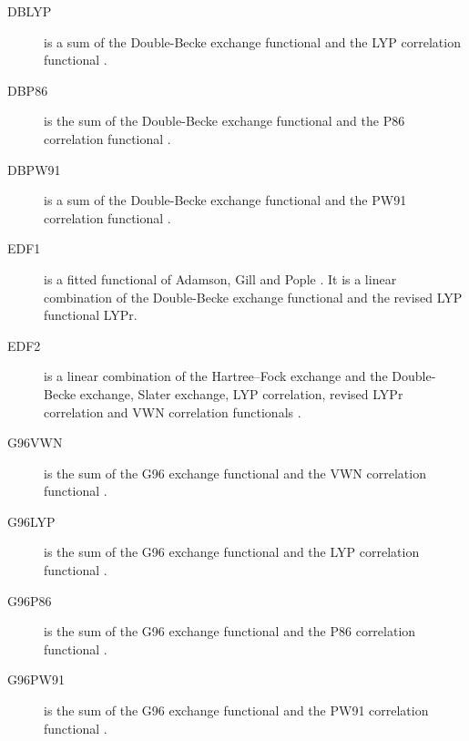 \begin{description}
\item[DBLYP] is a sum of the Double-Becke exchange functional and
  the LYP correlation functional 
  \cite{dft:becke88,dft:edf1,dft:lyp1,dft:lyp2}.

\item[DBP86] is the sum of the Double-Becke exchange functional and
  the P86 correlation functional \cite{dft:becke88,dft:edf1,dft:p86}.

\item[DBPW91] is a sum of the Double-Becke exchange functional and
  the PW91 correlation functional \cite{dft:becke88,dft:edf1,dft:pw91}.

\item[EDF1] is a fitted functional of Adamson, Gill and Pople \cite{dft:edf1}.
  It is a linear combination of the Double-Becke exchange functional and the revised LYP
  functional LYPr.

\item[EDF2] is a linear combination of the Hartree--Fock exchange and the Double-Becke 
  exchange, Slater exchange, LYP correlation, revised LYPr correlation and VWN 
  correlation functionals \cite{dft:edf2}.

\item[G96VWN] is the sum of the G96 exchange functional and the VWN 
  correlation functional \cite{dft:g96}.

\item[G96LYP] is the sum of the G96 exchange functional and the LYP
  correlation functional \cite{dft:g96}.

\item[G96P86] is the sum of the G96 exchange functional and the P86
  correlation functional \cite{dft:g96}.

\item[G96PW91] is the sum of the G96 exchange functional and the PW91
  correlation functional \cite{dft:g96}.


\end{description}
